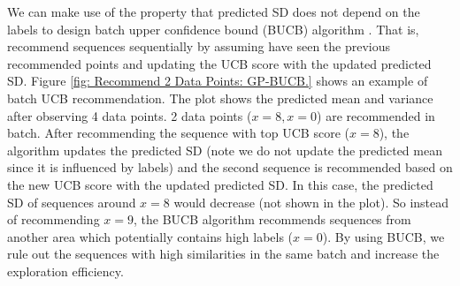 We can make use of the property that predicted SD does not depend on the labels to design batch upper confidence bound (BUCB) algorithm \cite{desautels2012parallelizing}.
That is, recommend sequences sequentially by assuming have seen the previous recommended points and updating the UCB score with the updated predicted SD. 
Figure \ref{fig: Recommend 2 Data Points: GP-BUCB.} shows an example of batch UCB recommendation. 
The plot shows the predicted mean and variance after observing 4 data points. 
2 data points ($x = 8, x = 0$) are recommended in batch. 
After recommending the sequence with top UCB score ($x = 8$), the algorithm updates the predicted SD (note we do not update the predicted mean since it is influenced by labels) and the second sequence is recommended based on the new UCB score with the updated predicted SD. 
In this case, the predicted SD of sequences around $x = 8$ would decrease (not shown in the plot). 
So instead of recommending $x = 9$, the BUCB algorithm recommends sequences from another area which potentially contains high labels ($x = 0$).
By using BUCB, we rule out the sequences with high similarities in the same batch and increase the exploration efficiency. 

